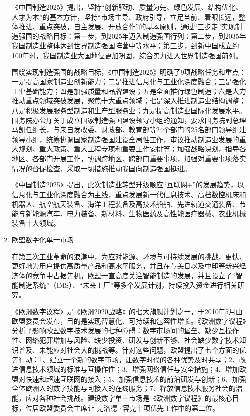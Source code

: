 \documentclass[lang=cn,12pt,bibtex,newtx,twoside,margintrue,citestyle=gb7714-2015, bibstyle=gb7714-2015]{elegantbook}
\begin{document}
\begin{enumerate}
《中国制造2025》提出，坚持“创新驱动、质量为先、绿色发展、结构优化、人才为本”的基本方针，坚持“市场主导、政府引导，立足当前、着眼长远，整体推进、重点突破，自主发展、开放合作”的基本原则，通过“三步走”实现制造强国的战略目标：第一步，到2025年迈入制造强国行列；第二步，到2035年我国制造业整体达到世界制造强国阵营中等水平；第三步，到新中国成立约100年时，我国制造业大国地位更加巩固，综合实力进入世界制造强国前列。

围绕实现制造强国的战略目标，《中国制造2025》明确了9项战略任务和重点：一是提高国家制造业创新能力；二是推进信息化与工业化深度融合；三是强化工业基础能力；四是加强质量和品牌建设；五是全面推行绿色制造；六是大力推动重点领域突破发展，聚焦十大重点领域；七是深入推进制造业结构调整；八是积极发展服务型制造和生产型服务业；九是提高制造业国际化发展水平。国务院办公厅关于成立国家制造强国建设领导小组的通知，要求国务院副总理马凯任组长，与来自发改委、财政部、教育部等24个部门的25名部门领导组建领导小组，统筹协调国家制造强国建设全局性工作，审议推动制造业发展的重大规划、重大政策、重大工程专项和重要工作安排等；加强战略谋划，指导各地区、各部门开展工作，协调跨地区、跨部门重要事项，加强对重要事项落实情况的督促检查，采取一切措施推动我国向制造强国挺进。

《中国制造2025》提出，此次制造业转型升级顺应“互联网+”的发展趋势，以信息化与工业化深度融合为主线，重点发展新一代信息技术、高档数控机床和机器人、航空航天装备、海洋工程装备及高技术船舶、先进轨道交通装备、节能与新能源汽车、电力装备、新材料、生物医药及高性能医疗器械、农业机械装备十大领域。

\item 欧盟数字化单一市场
\label{sec:org1904c6f}

在第三次工业革命的浪潮中，为应对能源、环境与可持续发展的挑战，更快、更好地为用户提供高质量产品和高水平服务，并且在与美日以及中印等新兴经济体的竞争中占据先机，欧盟一直高度关注智能制造的发展，并且设立了“智能制造系统”（IMS）、“未来工厂”等多个发展计划，持续投入资金进行相关研究。

《欧洲数字议程》是《欧洲2020战略》的七大旗舰计划之一，于2010年5月由欧盟委员会发布，目的是实现智慧化、可持续和包容性增长。《欧洲数字议程》分析了影响欧盟数字技术发展的七种障碍：数字市场间的堡垒、缺少互操作性、网络犯罪增加与风险、缺少投资、研发与创新不够、社会缺少数字技术知识普及、未能应对社会大的挑战等。针对这些问题，欧盟提出了七个方面的优先行动：1、建立一个新的数字市场，让数字时代的各种优势及时共享；2、改进信息技术领域的标准与互操作性；3、增强网络信任与安全措施；4、增加欧盟对快速和超速互联网的接入；5、加强信息技术的前沿研发与创新；6、加强全体欧洲人的数字技能与可接入的在线服务；7、释放信息技术服务社会的潜能，应对各种社会挑战。建设数字单一市场是《欧洲数字议程》的最核心目标，位居欧盟委员会主席让-克洛德·容克十项优先工作中的第二位。


\end{enumerate}
\end{document}
